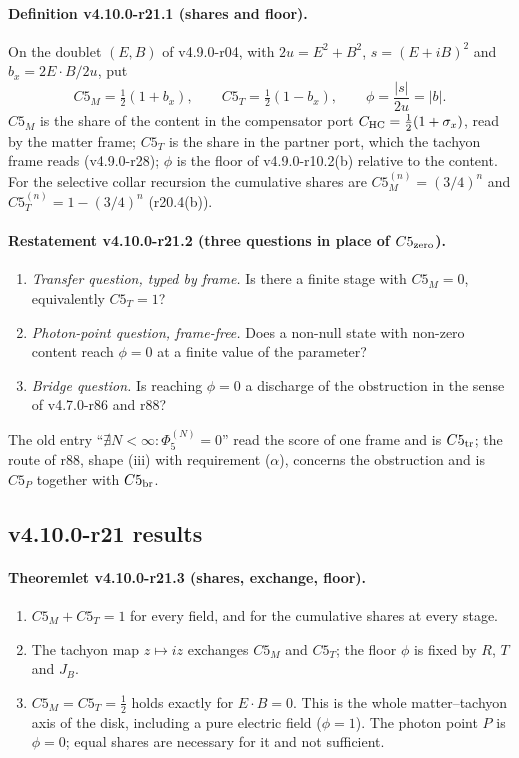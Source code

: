 \paragraph{Definition v4.10.0-r21.1 (shares and floor).}
On the doublet \((E,B)\) of v4.9.0-r04, with \(2u=E^2+B^2\), \(s=(E+iB)^2\) and \(b_x=2E\cdot B/2u\), put
\[
C5_M=\tfrac12(1+b_x),\qquad C5_T=\tfrac12(1-b_x),\qquad \phi=\frac{|s|}{2u}=|b| .
\]
\(C5_M\) is the share of the content in the compensator port \(C_{\rm HC}=\tfrac12(1+\sigma_x)\), read by the matter frame; \(C5_T\) is the
share in the partner port, which the tachyon frame reads (v4.9.0-r28); \(\phi\) is the floor of v4.9.0-r10.2(b) relative to the content.
For the selective collar recursion the cumulative shares are \(C5_M^{(n)}=(3/4)^n\) and \(C5_T^{(n)}=1-(3/4)^n\) (r20.4(b)).

\paragraph{Restatement v4.10.0-r21.2 (three questions in place of \(C5_{\rm zero}\)).}
\begin{enumerate}[leftmargin=2em]
\item[\(C5_{\rm tr}\)] \emph{Transfer question, typed by frame.}  Is there a finite stage with \(C5_M=0\), equivalently \(C5_T=1\)?
\item[\(C5_P\)] \emph{Photon-point question, frame-free.}  Does a non-null state with non-zero content reach \(\phi=0\) at a finite value of the
parameter?
\item[\(C5_{\rm br}\)] \emph{Bridge question.}  Is reaching \(\phi=0\) a discharge of the obstruction in the sense of v4.7.0-r86 and r88?
\end{enumerate}
The old entry ``\(\nexists N<\infty:\Phi_5^{(N)}=0\)'' read the score of one frame and is \(C5_{\rm tr}\); the route of r88, shape (iii) with
requirement (\(\alpha\)), concerns the obstruction and is \(C5_P\) together with \(C5_{\rm br}\).

\subsection*{v4.10.0-r21 results}
\label{subsec:v4100-r21-results}

\paragraph{Theoremlet v4.10.0-r21.3 (shares, exchange, floor).}
\begin{enumerate}[leftmargin=2em]
\item[(a)] \(C5_M+C5_T=1\) for every field, and for the cumulative shares at every stage.
\item[(b)] The tachyon map \(z\mapsto iz\) exchanges \(C5_M\) and \(C5_T\); the floor \(\phi\) is fixed by \(R\), \(T\) and \(J_B\).
\item[(c)] \(C5_M=C5_T=\tfrac12\) holds exactly for \(E\cdot B=0\).  This is the whole matter--tachyon axis of the disk, including a pure
electric field (\(\phi=1\)).  The photon point \(P\) is \(\phi=0\); equal shares are necessary for it and not sufficient.
\end{enumerate}

